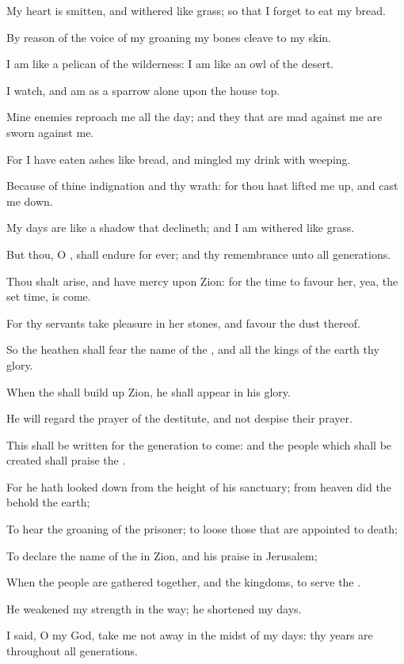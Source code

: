 \verse My heart is smitten, and withered like grass; so that I forget to eat my bread.

\verse By reason of the voice of my groaning my bones cleave to my skin.

\verse I am like a pelican of the wilderness: I am like an owl of the desert.

\verse I watch, and am as a sparrow alone upon the house top.

\verse Mine enemies reproach me all the day; and they that are mad against me are sworn against me.

\verse For I have eaten ashes like bread, and mingled my drink with weeping.

\verse Because of thine indignation and thy wrath: for thou hast lifted me up, and cast me down.

\verse My days are like a shadow that declineth; and I am withered like grass.

\verse But thou, O \LORD, shall endure for ever; and thy remembrance unto all generations.

\verse Thou shalt arise, and have mercy upon Zion: for the time to favour her, yea, the set time, is come.

\verse For thy servants take pleasure in her stones, and favour the dust thereof.

\verse So the heathen shall fear the name of the \LORD, and all the kings of the earth thy glory.

\verse When the \LORD shall build up Zion, he shall appear in his glory.

\verse He will regard the prayer of the destitute, and not despise their prayer.

\verse This shall be written for the generation to come: and the people which shall be created shall praise the \LORD.

\verse For he hath looked down from the height of his sanctuary; from heaven did the \LORD behold the earth;

\verse To hear the groaning of the prisoner; to loose those that are appointed to death;

\verse To declare the name of the \LORD in Zion, and his praise in Jerusalem;

\verse When the people are gathered together, and the kingdoms, to serve the \LORD.

\verse He weakened my strength in the way; he shortened my days.

\verse I said, O my God, take me not away in the midst of my days: thy years are throughout all generations.

